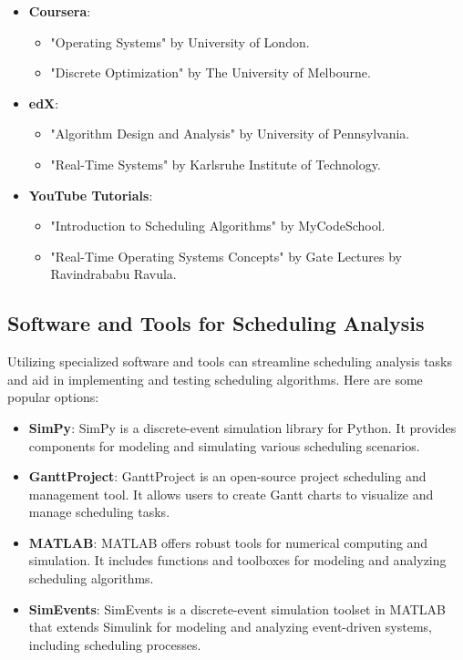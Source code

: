 \documentclass[12pt]{book} %
\begin{document}
\begin{itemize}
    \item \textbf{Coursera}:
    \begin{itemize}
        \item "Operating Systems" by University of London.
        \item "Discrete Optimization" by The University of Melbourne.
    \end{itemize}
    
    \item \textbf{edX}:
    \begin{itemize}
        \item "Algorithm Design and Analysis" by University of Pennsylvania.
        \item "Real-Time Systems" by Karlsruhe Institute of Technology.
    \end{itemize}
    
    \item \textbf{YouTube Tutorials}:
    \begin{itemize}
        \item "Introduction to Scheduling Algorithms" by MyCodeSchool.
        \item "Real-Time Operating Systems Concepts" by Gate Lectures by Ravindrababu Ravula.
    \end{itemize}
\end{itemize}

\subsection{Software and Tools for Scheduling Analysis}

Utilizing specialized software and tools can streamline scheduling analysis tasks and aid in implementing and testing scheduling algorithms. Here are some popular options:

\begin{itemize}
    \item \textbf{SimPy}: SimPy is a discrete-event simulation library for Python. It provides components for modeling and simulating various scheduling scenarios.
    
    \item \textbf{GanttProject}: GanttProject is an open-source project scheduling and management tool. It allows users to create Gantt charts to visualize and manage scheduling tasks.
    
    \item \textbf{MATLAB}: MATLAB offers robust tools for numerical computing and simulation. It includes functions and toolboxes for modeling and analyzing scheduling algorithms.
    
    \item \textbf{SimEvents}: SimEvents is a discrete-event simulation toolset in MATLAB that extends Simulink for modeling and analyzing event-driven systems, including scheduling processes.
\end{itemize}
\end{document}
